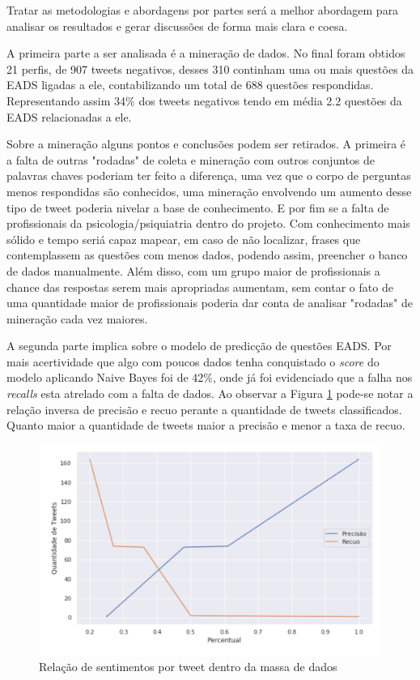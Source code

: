 Tratar as metodologias e abordagens por partes será a melhor abordagem para analisar os resultados e gerar discussões de forma mais clara e coesa.

A primeira parte a ser analisada é a mineração de dados. No final foram obtidos 21 perfis, de 907 tweets negativos, desses 310 continham uma ou mais questões da EADS ligadas a ele, contabilizando um total de 688 questões respondidas. Representando assim 34\% dos tweets negativos tendo em média 2.2 questões da EADS relacionadas a ele.

Sobre a mineração alguns pontos e conclusões podem ser retirados. A primeira é a falta de outras "rodadas" de coleta e mineração com outros conjuntos de palavras chaves poderiam ter feito a diferença, uma vez que o corpo de perguntas menos respondidas são conhecidos, uma mineração envolvendo um aumento desse tipo de tweet poderia nivelar a base de conhecimento. E por fim se a falta de profissionais da psicologia/psiquiatria dentro do projeto. Com conhecimento mais sólido e tempo seriá capaz mapear, em caso de não localizar, frases que contemplassem as questões com menos dados, podendo assim, preencher o banco de dados manualmente. Além disso, com um grupo maior de profissionais a chance das respostas serem mais apropriadas aumentam, sem contar o fato de uma quantidade maior de profissionais poderia dar conta de analisar "rodadas" de mineração cada vez maiores.

A segunda parte implica sobre o modelo de predicção de questões EADS. Por mais acertividade que algo com poucos dados tenha conquistado o \textit{score} do modelo aplicando Naive Bayes foi de 42\%, onde já foi evidenciado que a falha nos \textit{recalls} esta atrelado com a falta de dados. Ao observar a Figura \ref{fig:rpr} pode-se notar a relação inversa de precisão e recuo perante a quantidade de tweets classificados. Quanto maior a quantidade de tweets maior a precisão e menor a taxa de recuo.

\begin{figure}[!ht]
    \centering
    \includegraphics[width=.75\textwidth]{imagens/rpr.png}
    \caption{Relação de sentimentos por tweet dentro da massa de dados}
    \label{fig:rpr}
\end{figure}

